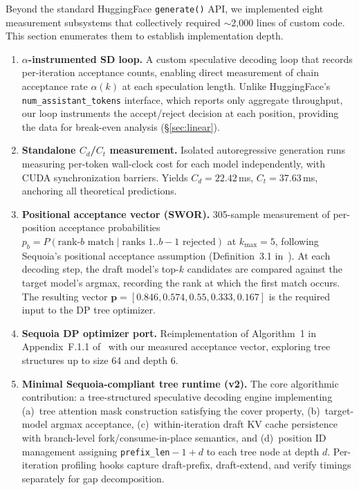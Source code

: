 \documentclass[letterpaper,twocolumn,10pt]{article}
\begin{document}
Beyond the standard HuggingFace \texttt{generate()} API, we implemented eight measurement subsystems that collectively required $\sim$2{,}000 lines of custom code.
This section enumerates them to establish implementation depth.

\begin{enumerate}
\itemsep=2pt
\item \textbf{$\alpha$-instrumented SD loop.}
A custom speculative decoding loop that records per-iteration acceptance counts, enabling direct measurement of chain acceptance rate $\alpha(k)$ at each speculation length.
Unlike HuggingFace's \texttt{num\_assistant\_tokens} interface, which reports only aggregate throughput, our loop instruments the accept/reject decision at each position, providing the data for break-even analysis (\S\ref{sec:linear}).

\item \textbf{Standalone $C_d$/$C_t$ measurement.}
Isolated autoregressive generation runs measuring per-token wall-clock cost for each model independently, with CUDA synchronization barriers.
Yields $C_d = 22.42$\,ms, $C_t = 37.63$\,ms, anchoring all theoretical predictions.

\item \textbf{Positional acceptance vector (SWOR).}
305-sample measurement of per-position acceptance probabilities $p_b = P(\text{rank-}b\text{ match} \mid \text{ranks } 1{..}b{-}1 \text{ rejected})$ at $k_{\max}=5$, following Sequoia's positional acceptance assumption (Definition~3.1 in~\cite{chen2024sequoia}).
At each decoding step, the draft model's top-$k$ candidates are compared against the target model's argmax, recording the rank at which the first match occurs.
The resulting vector $\mathbf{p} = [0.846, 0.574, 0.55, 0.333, 0.167]$ is the required input to the DP tree optimizer.

\item \textbf{Sequoia DP optimizer port.}
Reimplementation of Algorithm~1 in Appendix~F.1.1 of~\cite{chen2024sequoia} with our measured acceptance vector, exploring tree structures up to size 64 and depth 6.

\item \textbf{Minimal Sequoia-compliant tree runtime (v2).}
The core algorithmic contribution: a tree-structured speculative decoding engine implementing (a)~tree attention mask construction satisfying the cover property, (b)~target-model argmax acceptance, (c)~within-iteration draft KV cache persistence with branch-level fork/consume-in-place semantics, and (d)~position ID management assigning \texttt{prefix\_len}${} - 1 + d$ to each tree node at depth $d$.
Per-iteration profiling hooks capture draft-prefix, draft-extend, and verify timings separately for gap decomposition.


\end{enumerate}
\end{document}
